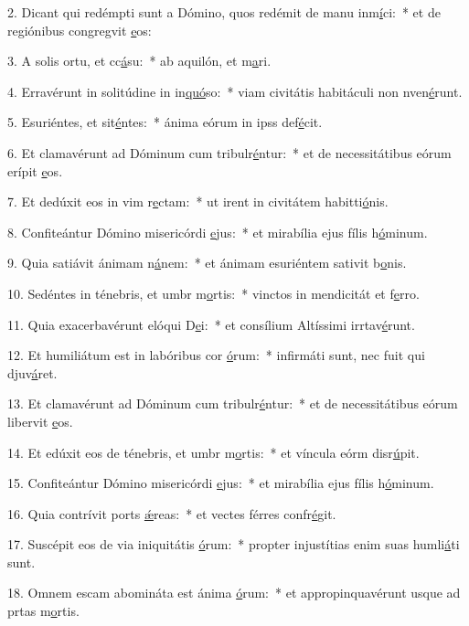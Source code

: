 2. Dicant qui redémpti sunt a Dómino, quos redémit de manu inm\uline{í}ci:~* et de regiónibus congregvit \uline{e}os:\par 
3. A solis ortu, et cc\uline{á}su:~* ab aquilón, et m\uline{a}ri.\par 
4. Erravérunt in solitúdine in in\uline{quó}so:~* viam civitátis habitáculi non nven\uline{é}runt.\par 
5. Esuriéntes, et sit\uline{é}ntes:~* ánima eórum in ipss def\uline{é}cit.\par 
6. Et clamavérunt ad Dóminum cum tribulr\uline{é}ntur:~* et de necessitátibus eórum erípit \uline{e}os.\par 
7. Et dedúxit eos in vim r\uline{e}ctam:~* ut irent in civitátem habitti\uline{ó}nis.\par 
8. Confiteántur Dómino misericórdi \uline{e}jus:~* et mirabília ejus fílis h\uline{ó}minum.\par 
9. Quia satiávit ánimam n\uline{á}nem:~* et ánimam esuriéntem sativit b\uline{o}nis.\par 
10. Sedéntes in ténebris, et umbr m\uline{o}rtis:~* vinctos in mendicitát et f\uline{e}rro.\par 
11. Quia exacerbavérunt elóqui D\uline{e}i:~* et consílium Altíssimi irrtav\uline{é}runt.\par 
12. Et humiliátum est in labóribus cor \uline{ó}rum:~* infirmáti sunt, nec fuit qui djuv\uline{á}ret.\par 
13. Et clamavérunt ad Dóminum cum tribulr\uline{é}ntur:~* et de necessitátibus eórum libervit \uline{e}os.\par 
14. Et edúxit eos de ténebris, et umbr m\uline{o}rtis:~* et víncula eórm disr\uline{ú}pit.\par 
15. Confiteántur Dómino misericórdi \uline{e}jus:~* et mirabília ejus fílis h\uline{ó}minum.\par 
16. Quia contrívit ports \uline{ǽ}reas:~* et vectes férres confr\uline{é}git.\par 
17. Suscépit eos de via iniquitátis \uline{ó}rum:~* propter injustítias enim suas humli\uline{á}ti sunt.\par 
18. Omnem escam abomináta est ánima \uline{ó}rum:~* et appropinquavérunt usque ad prtas m\uline{o}rtis.\par 
